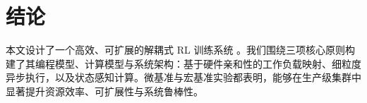 \section{结论}
本文设计了一个高效、可扩展的解耦式 RL 训练系统 \SystemName{}。我们围绕三项核心原则构建了其编程模型、计算模型与系统架构：基于硬件亲和性的工作负载映射、细粒度异步执行，以及状态感知计算。微基准与宏基准实验都表明，\SystemName{}能够在生产级集群中显著提升资源效率、可扩展性与系统鲁棒性。
